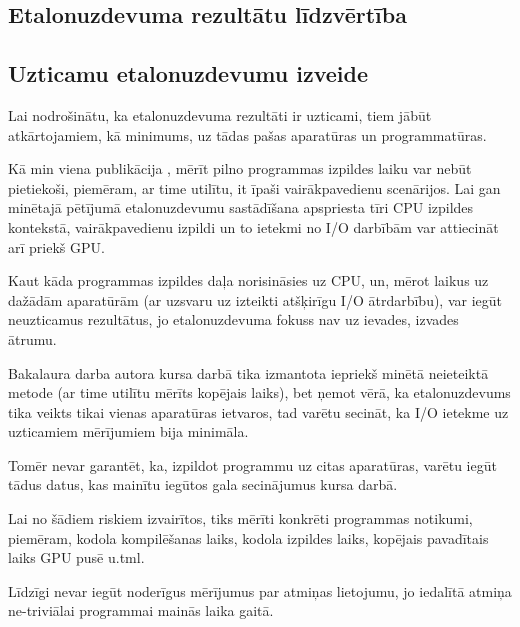 \documentclass[12pt]{report}%
\theoremstyle{definition}
\begin{document}







\begin{center}
    \chapter{Etalonuzdevuma rezultātu līdzvērtība}
\end{center}


\section{Uzticamu etalonuzdevumu izveide}

Lai nodrošinātu, ka etalonuzdevuma rezultāti ir uzticami, tiem jābūt
atkārtojamiem, kā minimums, uz tādas pašas aparatūras un programmatūras.
\cite{reliable-benchmarking}



Kā min viena publikācija \cite{reliable-benchmarking}, mērīt pilno programmas
izpildes laiku var nebūt pietiekoši, piemēram, ar time utilītu, it īpaši
vairākpavedienu scenārijos. Lai gan minētajā pētījumā etalonuzdevumu
sastādīšana apspriesta tīri CPU izpildes kontekstā, vairākpavedienu izpildi un
to ietekmi no I/O darbībām var attiecināt arī priekš GPU.

Kaut kāda programmas izpildes daļa norisināsies uz CPU, un, mērot laikus uz
dažādām aparatūrām (ar uzsvaru uz izteikti atšķirīgu I/O ātrdarbību), var iegūt
neuzticamus rezultātus, jo etalonuzdevuma fokuss nav uz ievades, izvades
ātrumu.

Bakalaura darba autora kursa darbā\cite{kursa-darbs} tika izmantota iepriekš
minētā neieteiktā metode (ar time utilītu mērīts kopējais laiks), bet ņemot
vērā, ka etalonuzdevums tika veikts tikai vienas aparatūras ietvaros, tad
varētu secināt, ka I/O ietekme uz uzticamiem mērījumiem bija minimāla.

Tomēr nevar garantēt, ka, izpildot programmu uz citas aparatūras, varētu iegūt
tādus datus, kas mainītu iegūtos gala secinājumus kursa darbā.

Lai no šādiem riskiem izvairītos, tiks mērīti konkrēti programmas notikumi,
piemēram, kodola kompilēšanas laiks, kodola izpildes laiks, kopējais pavadītais
laiks GPU pusē u.tml.


Līdzīgi nevar iegūt noderīgus mērījumus par atmiņas lietojumu, jo iedalītā atmiņa ne-triviālai programmai mainās laika gaitā.
\end{document}
